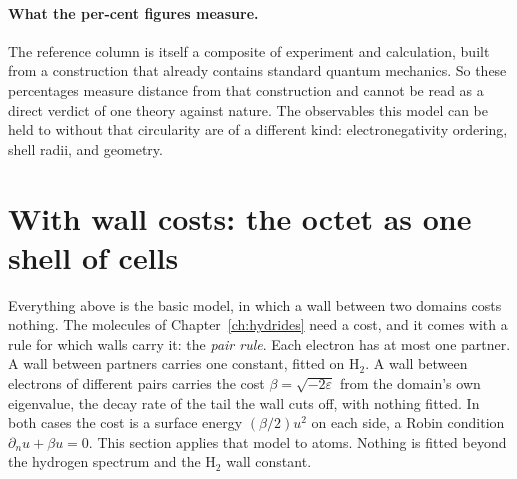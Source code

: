 \paragraph{What the per-cent figures measure.}
The reference column is itself a composite of experiment and calculation, built from a
construction that already contains standard quantum mechanics. So these percentages measure
distance from that construction and cannot be read as a direct verdict of one theory against
nature. The observables this model can be held to without that circularity are of a different
kind: electronegativity ordering, shell radii, and geometry.

\section{With wall costs: the octet as one shell of cells}\label{sec:walls-atoms}

Everything above is the basic model, in which a wall between two domains costs nothing. The molecules
of Chapter~\ref{ch:hydrides} need a cost, and it comes with a rule for which walls carry it: the
\emph{pair rule}. Each electron has at most one partner. A wall between partners carries one constant,
fitted on H$_2$. A wall between electrons of different pairs carries the cost $\beta=\sqrt{-2\varepsilon}$
from the domain's own eigenvalue, the decay rate of the tail the wall cuts off, with nothing fitted. In
both cases the cost is a surface energy $(\beta/2)u^2$ on each side, a Robin condition
$\partial_n u+\beta u=0$. This section applies that model to atoms. Nothing is fitted beyond the hydrogen
spectrum and the H$_2$ wall constant.

